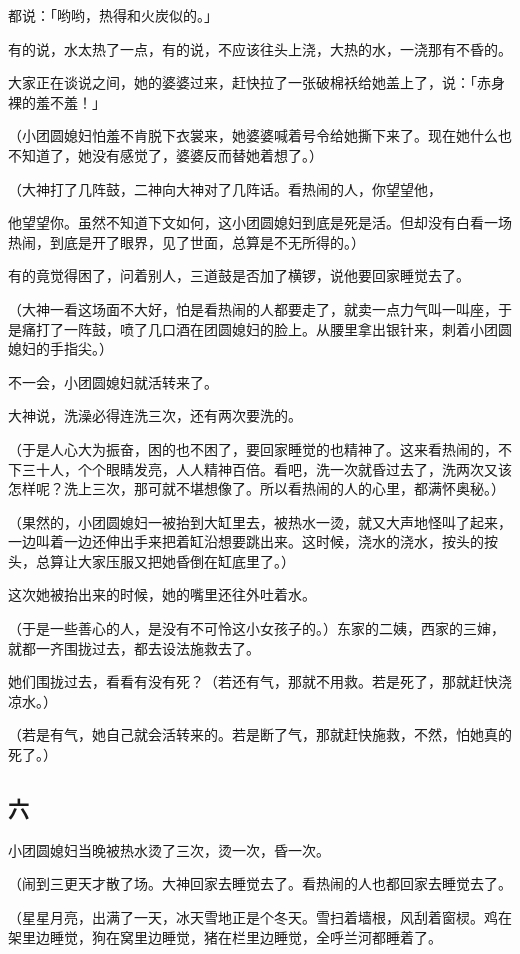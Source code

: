 \documentclass[UTF8]{ctexart}
\begin{document}
都说：「哟哟，热得和火炭似的。」

有的说，水太热了一点，有的说，不应该往头上浇，大热的水，一浇那有不昏的。

大家正在谈说之间，她的婆婆过来，赶快拉了一张破棉袄给她盖上了，说：「赤身裸的羞不羞！」

（小团圆媳妇怕羞不肯脱下衣裳来，她婆婆喊着号令给她撕下来了。现在她什么也不知道了，她没有感觉了，婆婆反而替她着想了。）

（大神打了几阵鼓，二神向大神对了几阵话。看热闹的人，你望望他，

他望望你。虽然不知道下文如何，这小团圆媳妇到底是死是活。但却没有白看一场热闹，到底是开了眼界，见了世面，总算是不无所得的。）

有的竟觉得困了，问着别人，三道鼓是否加了横锣，说他要回家睡觉去了。

（大神一看这场面不大好，怕是看热闹的人都要走了，就卖一点力气叫一叫座，于是痛打了一阵鼓，喷了几口酒在团圆媳妇的脸上。从腰里拿出银针来，刺着小团圆媳妇的手指尖。）

不一会，小团圆媳妇就活转来了。

大神说，洗澡必得连洗三次，还有两次要洗的。

（于是人心大为振奋，困的也不困了，要回家睡觉的也精神了。这来看热闹的，不下三十人，个个眼睛发亮，人人精神百倍。看吧，洗一次就昏过去了，洗两次又该怎样呢？洗上三次，那可就不堪想像了。所以看热闹的人的心里，都满怀奥秘。）

（果然的，小团圆媳妇一被抬到大缸里去，被热水一烫，就又大声地怪叫了起来，一边叫着一边还伸出手来把着缸沿想要跳出来。这时候，浇水的浇水，按头的按头，总算让大家压服又把她昏倒在缸底里了。）

这次她被抬出来的时候，她的嘴里还往外吐着水。

（于是一些善心的人，是没有不可怜这小女孩子的。）东家的二姨，西家的三婶，就都一齐围拢过去，都去设法施救去了。

她们围拢过去，看看有没有死？（若还有气，那就不用救。若是死了，那就赶快浇凉水。）

（若是有气，她自己就会活转来的。若是断了气，那就赶快施救，{不然，怕她真的死了。}）

\subsection{六}

小团圆媳妇当晚被热水烫了三次，烫一次，昏一次。

（闹到三更天才散了场。大神回家去睡觉去了。看热闹的人也都回家去睡觉去了。

（星星月亮，出满了一天，冰天雪地正是个冬天。雪扫着墙根，风刮着窗棂。鸡在架里边睡觉，狗在窝里边睡觉，猪在栏里边睡觉，全呼兰河都睡着了。
\end{document}
